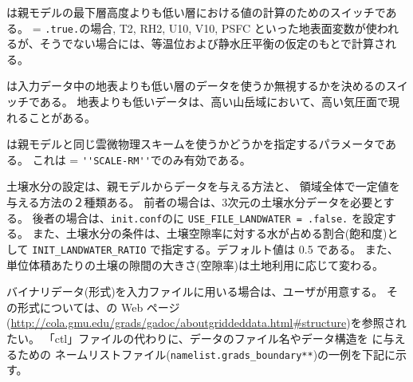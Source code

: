 は親モデルの最下層高度よりも低い層における値の計算のためのスイッチである。
 = \verb|.true.|の場合, T2, RH2, U10, V10, PSFC といった地表面変数が使われるが、そうでない場合には、等温位および静水圧平衡の仮定のもとで計算される。

は入力データ中の地表よりも低い層のデータを使うか無視するかを決めるのスイッチである。
地表よりも低いデータは、高い山岳域において、高い気圧面で現れることがある。


は親モデルと同じ雲微物理スキームを使うかどうかを指定するパラメータである。
これは = \verb|''SCALE-RM''|でのみ有効である。



土壌水分の設定は、親モデルからデータを与える方法と、
領域全体で一定値を与える方法の２種類ある。
前者の場合は、3次元の土壌水分データを必要とする。
後者の場合は、\verb|init.conf|のに
\verb|USE_FILE_LANDWATER = .false.| を設定する。
また、土壌水分の条件は、土壌空隙率に対する水が占める割合(飽和度)として
\verb|INIT_LANDWATER_RATIO| で指定する。デフォルト値は 0.5 である。
また、単位体積あたりの土壌の隙間の大きさ(空隙率)は土地利用に応じて変わる。\\

バイナリデータ({\grads}形式)を入力ファイルに用いる場合は、ユーザが用意する。
その形式については、\grads の Web ページ
(\url{http://cola.gmu.edu/grads/gadoc/aboutgriddeddata.html#structure})を参照されたい。
「ctl」ファイルの代わりに、データのファイル名やデータ構造を \scalerm に与えるための
ネームリストファイル(\verb|namelist.grads_boundary**|)の一例を下記に示す。\\

